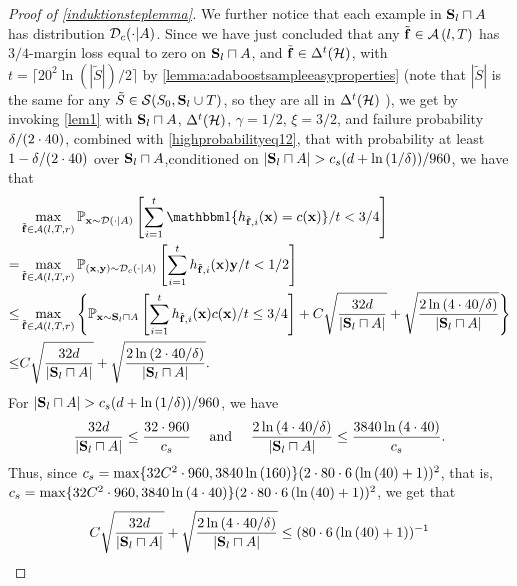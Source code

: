 \begin{proof}[Proof of \cref{induktionsteplemma}]
We further notice that each example in $\mathbf{S}_{l}\sqcap A$ has distribution $\mathcal{D}_{c}(\cdot| A)$. Since we have just concluded that any $\tilde{\mathbf{f}}\in \mathcal{A}\left(l,T\right)$ has $ 3/4 $-margin loss equal to zero on $\mathbf{S}_{l}\sqcap A$, and $\tilde{\mathbf{f}}\in \Delta^{t}(\mathcal{H})$, with $ t=\lceil20^{2}\ln{(|\tilde{S}|)}/2 \rceil $  by \cref{lemma:adaboostsampleeasyproperties} (note that $ |\tilde{S}| $ is the same for any $ \tilde{S} \in \mathcal{S}(S_{0},\mathbf{S}_{l}\cup T)$, so they are all in $ \Delta^{t}(\mathcal{H}) $ ),  we get by invoking \cref{lem1} with $\mathbf{S}_{l}\sqcap A$, $ \Delta^{t}(\mathcal{H}) $, $\gamma=1/2$, $\xi=3/2$, and failure probability $\delta/(2\cdot 40)$, combined with \cref{highprobabilityeq12}, that with probability at least $1-\delta/(2\cdot 40)$ over $\mathbf{S}_{l}\sqcap A$,conditioned on $ |\rS_{l}\sqcap A|>\cs(d+\ln{\left(1/\delta \right)})/960 $,  we have that
\begin{align}\label{highprobabilityeq9}
  &\max_{\rf\in \cA(l,T,r)} \p_{\rx\sim \cD(\cdot | A)}
  \left[
  \sum_{i=1}^{t} \ind\{h_{\rf,i}(\rx)=c(\rx)\}/t< 3/4 
  \right]\nonumber\\
  =
  &\max_{\rf\in \cA(l,T,r)} \p_{(\rx,\ry)\sim \cD_{c}(\cdot | A)}
  \left[
  \sum_{i=1}^{t} h_{\rf,i}(\rx)\ry/t< 1/2 \right]\nonumber 
  \\
  \leq 
  &\max_{\rf \in \cA(l,T,r)}\left\{ 
    \p_{\rx\sim \rS_{l}\sqcap A}
  \left[
  \sum_{i=1}^{t} h_{\rf,i}(\rx)c(\rx)/t\leq 3/4 \right] 
  +C\sqrt{\frac{32d}{|\rS_{l}\sqcap A|}}
  +\sqrt{\frac{2\ln{\left(4\cdot \cff/\delta \right)}}{|\rS_{l}\sqcap A|}}
  \right\}\nonumber
  \\
  \leq
  &C\sqrt{\frac{32d}{|\rS_{l}\sqcap A|}}
  +\sqrt{\frac{2\ln{\left(2\cdot \cff/\delta \right)}}{|\rS_{l}\sqcap A|}}.
\end{align}
For $|\rS_{l}\sqcap A|> \cs(d+\ln{\left(1/\delta \right)})/960$, we have
\begin{align*}
  \frac{32d}{|\mathbf{S}_{l}\sqcap A|}\leq \frac{32\cdot960}{c_s}
 \quad 
 \text{ and }
\quad 
\frac{2\ln{\left(4\cdot 40/\delta\right)}}{|\mathbf{S}_{l}\sqcap A|}\leq \frac{3840\ln{\left(4\cdot 40\right)}}{c_s}.
\end{align*}
Thus, since $c_s= \max\{32C^{2}\cdot 960,3840\ln{\left(160 \right)}\}(2\cdot 80\cdot 6 \left(\ln{\left(40 \right)}+1\right))^2$, that is, $c_s= \max\{32C^{2}\cdot 960,3840\ln{\left(4\cdot 40\right)}\}(2\cdot 80\cdot 6 \left(\ln{\left(40\right)}+1\right))^2$,  we get that 
\begin{align*}
  C\sqrt{\frac{32d}{|\rS_{l}\sqcap A|}}
  +\sqrt{\frac{2\ln{\left(4\cdot \cff/\delta \right)}}{|\rS_{l}\sqcap A|}}\leq
  (80\cdot 6 \left(\ln{\left(\cnn \right)}+1\right))^{-1}

\end{align*}
\end{proof}
